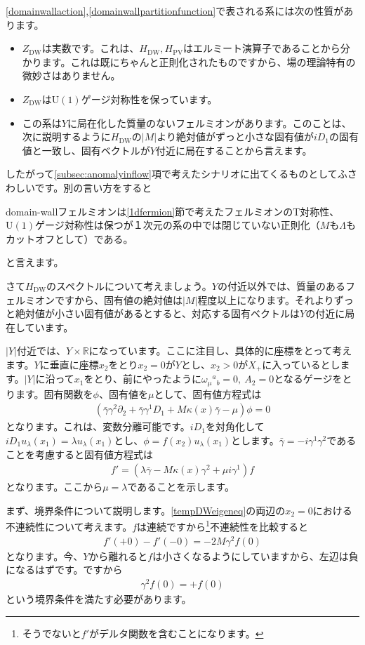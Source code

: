 \documentclass[paper=a4, fontsize=12pt, line_length=16cm, number_of_lines=33,dvipdfmx]{jlreq}
\numberwithin{equation}{section}
\newcommand{\del}{\partial}
\newcommand{\Rb}{\mathbb{R}}
\newcommand{\gammab}{\bar{\gamma}}
\newcommand{\U}{\mathrm{U}}
\newcommand{\HDW}{H_{\mathrm{DW}}}
\newcommand{\HPV}{H_{\mathrm{PV}}}
\newcommand{\ZDW}{Z_{\mathrm{DW}}}
\newenvironment{important}{\begin{tcolorbox}[
  colback = white,
  colframe = red!35,
  boxrule = 2mm,
  fonttitle = \bfseries,
  after = \noindent] }{\end{tcolorbox}}
\begin{document}
\eqref{domainwallaction},\eqref{domainwallpartitionfunction}で表される系には次の性質があります。
\begin{itemize}
  \item $\ZDW$は実数です。これは、$\HDW,\HPV$はエルミート演算子であることから分かります。これは既にちゃんと正則化されたものですから、場の理論特有の微妙さはありません。
  \item $\ZDW$は$\U(1)$ゲージ対称性を保っています。
  \item この系は$Y$に局在化した質量のないフェルミオンがあります。このことは、次に説明するように$\HDW$の$|M|$より絶対値がずっと小さな固有値が$iD_1$の固有値と一致し、固有ベクトルが$Y$付近に局在することから言えます。
\end{itemize}
したがって\ref{subsec:anomalyinflow}項で考えたシナリオに出てくるものとしてふさわしいです。別の言い方をすると
\begin{important}
  domain-wallフェルミオンは\ref{1dfermion}節で考えたフェルミオンのT対称性、$\U(1)$ゲージ対称性は保つが１次元の系の中では閉じていない正則化（$M$も$\Lambda$もカットオフとして）である。
\end{important}
と言えます。

さて$\HDW$のスペクトルについて考えましょう。$Y$の付近以外では、質量のあるフェルミオンですから、固有値の絶対値は$|M|$程度以上になります。それよりずっと絶対値が小さい固有値があるとすると、対応する固有ベクトルは$Y$の付近に局在しています。

$|Y|$付近では、$Y\times \Rb$になっています。ここに注目し、具体的に座標をとって考えます。$Y$に垂直に座標$x_2$をとり$x_2=0$が$Y$とし、$x_2>0$が$X_{+}$に入っているとします。$|Y|$に沿って$x_1$をとり、前にやったように$\omega_{\mu}{}^{a}{}_{b}=0,\ A_{2}=0$となるゲージをとります。固有関数を$\phi$、固有値を$\mu$として、固有値方程式は
\begin{align}
  (\gammab\gamma^{2}\del_{2}+\gammab\gamma^{1}D_{1}+M\kappa(x)\gammab-\mu)\phi=0
\end{align}
となります。これは、変数分離可能です。$iD_1$を対角化して$iD_1 u_{\lambda}(x_1)=\lambda u_{\lambda}(x_1)$とし、$\phi=f(x_2)u_{\lambda}(x_1)$とします。$\gammab=-i\gamma^1\gamma^2$であることを考慮すると固有値方程式は
\begin{align}
  f'=(\lambda \gammab - M\kappa(x)\gamma^2+\mu i\gamma^1)f
  \label{tempDWeigeneq}
\end{align}
となります。ここから$\mu=\lambda$であることを示します。

まず、境界条件について説明します。\eqref{tempDWeigeneq}の両辺の$x_2=0$における不連続性について考えます。$f$は連続ですから\footnote{そうでないと$f'$がデルタ関数を含むことになります。}不連続性を比較すると
\begin{align}
  f'(+0)-f'(-0)=-2M \gamma^2 f(0)
\end{align}
となります。今、$Y$から離れると$f$は小さくなるようにしていますから、左辺は負になるはずです。ですから
\begin{align}
  \gamma^2 f(0)=+f(0)\label{tempDWBC}
\end{align}
という境界条件を満たす必要があります。
\end{document}

